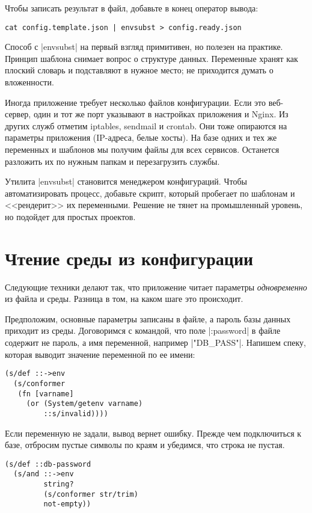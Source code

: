 \noindent
Чтобы записать результат в файл, добавьте в конец оператор вывода:

\begin{verbatim}
cat config.template.json | envsubst > config.ready.json
\end{verbatim}

Способ с \spverb|envsubst| на первый взгляд примитивен, но полезен на
практике. Принцип шаблона снимает вопрос о структуре данных. Переменные хранят
как плоский словарь и подставляют в нужное место; не приходится думать о
вложенности.

Иногда приложение требует несколько файлов конфигурации. Если это веб-сервер,
один и тот же порт указывают в настройках приложения и Nginx. Из других служб
отметим iptables, sendmail и crontab. Они тоже опираются на параметры приложения
(IP-адреса, белые хосты). На базе одних и тех же переменных и шаблонов мы
получим файлы для всех сервисов. Останется разложить их по нужным папкам и
перезагрузить службы.

Утилита \spverb|envsubst| становится менеджером конфигураций. Чтобы
автоматизировать процесс, добавьте скрипт, который пробегает по шаблонам и
<<рендерит>> их переменными. Решение не тянет на промышленный уровень, но
подойдет для простых проектов.

\section{Чтение среды из конфигурации}

Следующие техники делают так, что приложение читает параметры
\emph{одновременно} из файла и среды. Разница в том, на каком шаге это
происходит.

Предположим, основные параметры записаны в файле, а пароль базы данных приходит
из среды. Договоримся с командой, что поле \spverb|:password| в файле содержит
не пароль, а имя переменной, например \spverb|"DB_PASS"|. Напишем спеку, которая
выводит значение переменной по ее имени:

\begin{verbatim}
(s/def ::->env
  (s/conformer
   (fn [varname]
     (or (System/getenv varname)
         ::s/invalid))))
\end{verbatim}

Если переменную не задали, вывод вернет ошибку. Прежде чем подключиться к базе,
отбросим пустые символы по краям и убедимся, что строка не пустая.

\begin{verbatim}
(s/def ::db-password
  (s/and ::->env
         string?
         (s/conformer str/trim)
         not-empty))
\end{verbatim}

